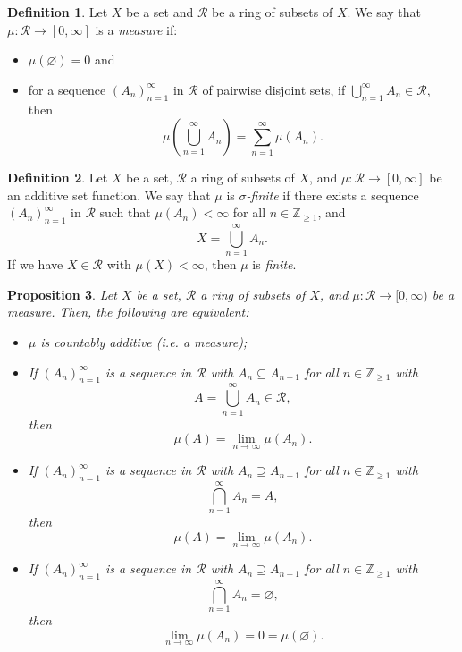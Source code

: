 \documentclass[a4paper, openany]{memoir}
\theoremstyle{definition}
\newtheorem{definition}{Definition}[section]
\theoremstyle{plain}
\newtheorem{proposition}[definition]{Proposition}
\begin{document}
    \begin{definition}
        Let $X$ be a set and $\mathcal{R}$ be a ring of subsets of $X$. We say that $\mu \colon \mathcal{R} \to [0, \infty]$ is a \emph{measure} if:
        \begin{itemize}
            \item $\mu(\varnothing) = 0$ and
            \item for a sequence $(A_n)_{n=1}^\infty$ in $\mathcal{R}$ of pairwise disjoint sets, if $\bigcup_{n=1}^\infty A_n \in \mathcal{R}$, then
            \[\mu \left(\bigcup_{n=1}^\infty A_n\right) = \sum_{n=1}^\infty \mu(A_n).\]
        \end{itemize}
    \end{definition}

    \begin{definition}
        Let $X$ be a set, $\mathcal{R}$ a ring of subsets of $X$, and $\mu \colon \mathcal{R} \to [0, \infty]$ be an additive set function. We say that $\mu$ is \emph{$\sigma$-finite} if there exists a sequence $(A_n)_{n=1}^\infty$ in $\mathcal{R}$ such that $\mu(A_n) < \infty$ for all $n \in \mathbb{Z}_{\geq 1}$, and
        \[X = \bigcup_{n=1}^\infty A_n.\]
        If we have $X \in \mathcal{R}$ with $\mu(X) < \infty$, then $\mu$ is \emph{finite}.
    \end{definition}

    \begin{proposition}
        Let $X$ be a set, $\mathcal{R}$ a ring of subsets of $X$, and $\mu \colon \mathcal{R} \to [0, \infty)$ be a measure. Then, the following are equivalent:
        \begin{itemize}
            \item $\mu$ is countably additive (i.e. a measure);
            \item If $(A_n)_{n=1}^\infty$ is a sequence in $\mathcal{R}$ with $A_n \subseteq A_{n+1}$ for all $n \in \mathbb{Z}_{\geq 1}$ with
            \[A = \bigcup_{n=1}^\infty A_n \in \mathcal{R},\]
            then
            \[\mu(A) = \lim_{n \to \infty} \mu(A_n).\]
            \item If $(A_n)_{n=1}^\infty$ is a sequence in $\mathcal{R}$ with $A_n \supseteq A_{n+1}$ for all $n \in \mathbb{Z}_{\geq 1}$ with
            \[\bigcap_{n=1}^\infty A_n = A,\]
            then
            \[\mu(A) = \lim_{n \to \infty} \mu(A_n).\]
            \item If $(A_n)_{n=1}^\infty$ is a sequence in $\mathcal{R}$ with $A_n \supseteq A_{n+1}$ for all $n \in \mathbb{Z}_{\geq 1}$ with
            \[\bigcap_{n=1}^\infty A_n = \varnothing,\]
            then
            \[\lim_{n \to \infty} \mu(A_n) = 0 = \mu(\varnothing).\]
        \end{itemize}
    \end{proposition}
\end{document}
